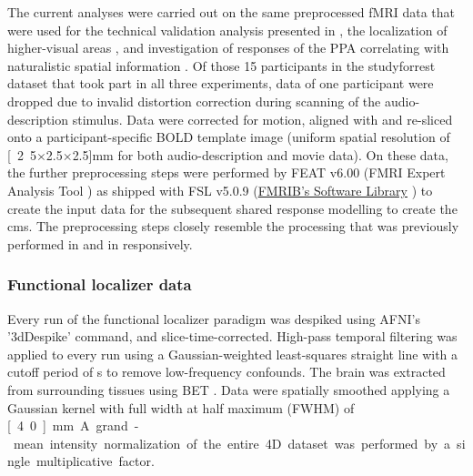 
The current analyses were carried out on the same preprocessed fMRI data
\citep{hanke2016aligned} that were used for the technical validation analysis
presented in \citet{hanke2016simultaneous}, the localization of higher-visual
areas \citep{sengupta2016extension}, and investigation of responses of the PPA
correlating with naturalistic spatial information \citep{sengupta2016extension}.
Of those 15 participants in the studyforrest dataset that took part in all three
experiments, data of one participant were dropped due to invalid distortion
correction during scanning of the audio-description stimulus.
Data were corrected for motion, aligned with and re-sliced onto a
participant-specific BOLD template image \citep{sengupta2016extension} (uniform
spatial resolution of \unit[2.5$\times$2.5$\times$2.5]{mm} for both
audio-description and movie data).
On these data, the further preprocessing steps were performed by FEAT v6.00
(FMRI Expert Analysis Tool \citep{woolrich2001autocorr}) as shipped with FSL
v5.0.9 (\href{https://www.fmrib.ox.ac.uk/fsl}{FMRIB's Software Library}
\citep{smith2004fsl}) to create the input data for the subsequent shared
response modelling to create the \ac{cms}.
%
The preprocessing steps closely resemble the processing that was previously
performed in \citet{sengupta2016extension} and in \citet{haeusler2022processing}
responsively.

%

\subsubsection{Functional localizer data}


Every run of the functional localizer paradigm was despiked using AFNI's
\citep{cox1996afni, cox1997software} '3dDespike' command, and
slice-time-corrected.
High-pass temporal filtering was applied to every run using a Gaussian-weighted
least-squares straight line with a cutoff period of \unit[100]{s} to remove
low-frequency confounds.
The brain was extracted from surrounding tissues using BET \citep{smith2002bet}.
Data were spatially smoothed applying a Gaussian kernel with full width at half
maximum (FWHM) of \unit[4.0]{mm}
A grand-mean intensity normalization of the entire 4D dataset was performed by a
single multiplicative factor.

